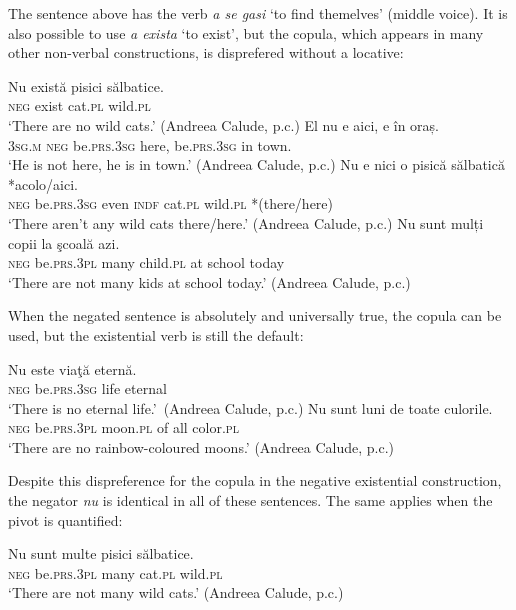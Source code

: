 \documentclass[output=paper,colorlinks,citecolor=brown]{langscibook}
\begin{document}
\begin{paperappendix}
\begin{unindented}
The sentence above has the verb \textit{a se gasi} `to find themelves' (middle voice). It is also possible to use \textit{a exista} `to exist', but the copula, which appears in many other non-verbal constructions, is disprefered without a locative:
%
\begin{exe}\ex \gll Nu există pisici sălbatice. \\
\textsc{neg} exist cat.\textsc{pl} wild.\textsc{pl} \\
    \glt `There are no wild cats.' (Andreea Calude, p.c.)
\ex \gll El nu e aici, e în oraș.  \\
\textsc{3sg.m} \textsc{neg} be.\textsc{prs}.\textsc{3sg} here,          be.\textsc{prs.3sg} in town.  \\
    \glt `He is not here, he is in town.' (Andreea Calude, p.c.)
\ex \gll Nu e nici o pisică sălbatică *{\op}acolo/aici{\cp}. \\
\textsc{neg} be.\textsc{prs}.\textsc{3sg} even \textsc{indf} cat.\textsc{pl}  wild.\textsc{pl} *(there/here) \\
    \glt `There aren't any wild cats there/here.' (Andreea Calude, p.c.)
\ex \gll Nu sunt mulți copii la şcoală azi.  \\
\textsc{neg} be.\textsc{prs.3pl} many child.\textsc{pl} at school today \\
    \glt `There are not many kids at school today.' (Andreea Calude, p.c.)
    \end{exe}

When the negated sentence is absolutely and universally true, the copula can be used, but the existential verb is still the default:
%
\begin{exe}\ex \gll Nu este viaţă eternă.  \\
\textsc{neg} be.\textsc{prs.3sg} life eternal \\
    \glt `There is no eternal life.'~(Andreea Calude, p.c.)
\ex \gll Nu sunt luni de toate culorile.  \\
\textsc{neg} be.\textsc{prs.3pl} moon.\textsc{pl} of all color.\textsc{pl} \\
    \glt `There are no rainbow-coloured moons.' (Andreea Calude, p.c.)
    \end{exe}

Despite this dispreference for the copula in the negative existential construction, the negator \textit{nu} is identical in all of these sentences. The same applies when the pivot is quantified:
%
\begin{exe}\ex \gll Nu sunt multe pisici sălbatice. \\
\textsc{neg} be.\textsc{prs.3pl} many cat.\textsc{pl} wild.\textsc{pl} \\
    \glt `There are not many wild cats.' (Andreea Calude, p.c.)
    \end{exe}


\end{unindented}
\end{paperappendix}
\end{document}

